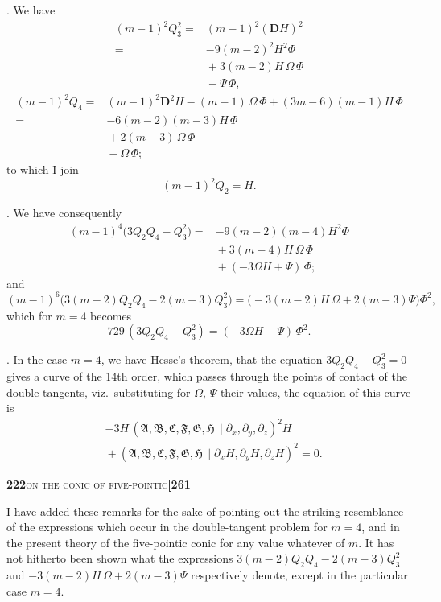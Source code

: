 \documentclass[11pt]{article}
\newcommand{\Cdel}{\mid}
\begin{document}
. We have
\[
\begin{aligned}
(m-1)^2 Q_3^2 ={}& (m-1)^2 (\mathbf{D}H)^2\\
={}& -9(m-2)^2 H^2 \Phi\\
&{}+ 3(m-2)H\,\Omega\,\Phi\\
&{}- \Psi\,\Phi,
\end{aligned}
\]
\[
\begin{aligned}
(m-1)^2 Q_4 ={}& (m-1)^2 \mathbf{D}^2 H - (m-1)\,\Omega\,\Phi + (3m-6)(m-1)H\,\Phi\\
={}& -6(m-2)(m-3)H\,\Phi\\
&{}+ 2(m-3)\,\Omega\,\Phi\\
&{}- \Omega\,\Phi;
\end{aligned}
\]
to which I join
\[
(m-1)^2 Q_2 = H.
\]

\medskip

. We have consequently
\[
\begin{aligned}
(m-1)^4\bigl(3Q_2 Q_4 - Q_3^2\bigr) ={}& -9(m-2)(m-4)H^2 \Phi\\
&{}+ 3(m-4)H\,\Omega\,\Phi\\
&{}+ (-3\Omega H + \Psi)\,\Phi;
\end{aligned}
\]
and
\[
(m-1)^6\bigl(3(m-2)Q_2 Q_4 - 2(m-3)Q_3^2\bigr) = \bigl(-3(m-2)H\,\Omega + 2(m-3)\Psi\bigr)\Phi^2,
\]
which for $m = 4$ becomes
\[
729\,(3Q_2 Q_4 - Q_3^2) = (-3\Omega H + \Psi)\,\Phi^2.
\]

\medskip

. In the case $m = 4$, we have Hesse's theorem, that the equation $3Q_2 Q_4 - Q_3^2 = 0$ gives a curve of the 14th order, which passes through the points of contact of the double tangents, viz.\ substituting for $\Omega$, $\Psi$ their values, the equation of this curve is
\[
\begin{aligned}
&-3H\,(\mathfrak{A}, \mathfrak{B}, \mathfrak{C}, \mathfrak{F}, \mathfrak{G}, \mathfrak{H}\,\Cdel\partial_x, \partial_y, \partial_z)^2 H\\
&{}+ (\mathfrak{A}, \mathfrak{B}, \mathfrak{C}, \mathfrak{F}, \mathfrak{G}, \mathfrak{H}\,\Cdel\partial_x H, \partial_y H, \partial_z H)^2 = 0.
\end{aligned}
\]

\newpage

\noindent\textbf{222}\hfill\textsc{on the conic of five-pointic}\hfill\textbf{[261}

\medskip

\noindent I have added these remarks for the sake of pointing out the striking resemblance of the expressions which occur in the double-tangent problem for $m = 4$, and in the present theory of the five-pointic conic for any value whatever of $m$. It has not hitherto been shown what the expressions $3(m-2)Q_2 Q_4 - 2(m-3)Q_3^2$ and $-3(m-2)H\,\Omega + 2(m-3)\Psi$ respectively denote, except in the particular case $m = 4$.
\end{document}
